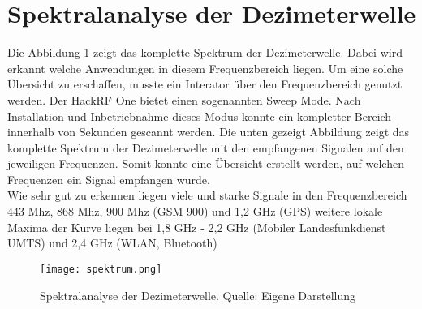 \section{Spektralanalyse der Dezimeterwelle}
Die Abbildung \ref{spektralanalyse} zeigt das komplette Spektrum der Dezimeterwelle. Dabei wird erkannt welche Anwendungen in diesem Frequenzbereich liegen. Um eine solche Übersicht zu erschaffen, musste ein Interator über den Frequenzbereich genutzt werden. Der HackRF One bietet einen sogenannten Sweep Mode. Nach Installation und Inbetriebnahme dieses Modus konnte ein kompletter Bereich innerhalb von Sekunden gescannt werden. Die unten gezeigt Abbildung zeigt das komplette Spektrum der Dezimeterwelle mit den empfangenen Signalen auf den jeweiligen Frequenzen. Somit konnte eine Übersicht erstellt werden, auf welchen Frequenzen ein Signal empfangen wurde.\\

Wie sehr gut zu erkennen liegen viele und starke Signale in den Frequenzbereich 443 Mhz, 868 Mhz, 900 Mhz (GSM 900) und 1,2 GHz (GPS) weitere lokale Maxima der Kurve liegen bei 1,8 GHz - 2,2 GHz (Mobiler Landesfunkdienst UMTS) und 2,4 GHz (WLAN, Bluetooth)
\begin{figure}[H]
	\centering
	\texttt{[image: spektrum.png]}
	\caption[Spektralanalyse der Dezimeterwelle]{Spektralanalyse der Dezimeterwelle. Quelle: Eigene Darstellung} 
	\label{spektralanalyse}
\end{figure}
